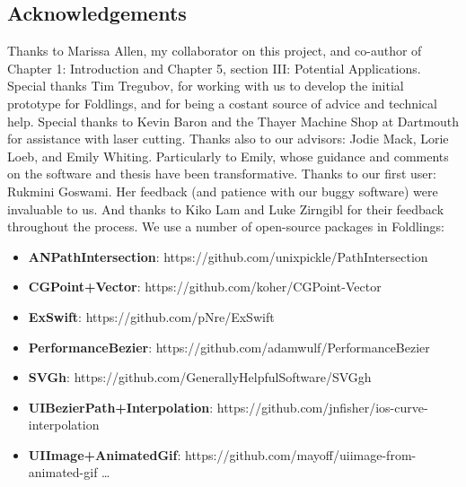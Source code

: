 \pagestyle{plain}
\begin{center}


\section*{Acknowledgements}
\singlespacing
Thanks to Marissa Allen, my collaborator on this project, and co-author of Chapter 1: Introduction and Chapter 5, section III: Potential Applications. \newline \newline
Special thanks Tim Tregubov, for working with us to develop the initial prototype for Foldlings, and for being a costant source of advice and technical help. \newline \newline
Special thanks to Kevin Baron and the Thayer Machine Shop at Dartmouth for assistance with laser cutting. \newline \newline
Thanks also to our advisors: Jodie Mack, Lorie Loeb, and Emily Whiting.  Particularly to Emily, whose guidance and comments on the software and thesis have been transformative. \newline \newline
Thanks to our first user: Rukmini Goswami.  Her feedback (and patience with our buggy software) were invaluable to us. \newline \newline
And thanks to Kiko Lam and Luke Zirngibl for their feedback throughout the process. \newline \newline \newline
We use a number of open-source packages in Foldlings:

\begin{itemize}
  \item \textbf{ANPathIntersection}: https://github.com/unixpickle/PathIntersection
  \item \textbf{CGPoint+Vector}: https://github.com/koher/CGPoint-Vector
  \item \textbf{ExSwift}: https://github.com/pNre/ExSwift
  \item \textbf{PerformanceBezier}: https://github.com/adamwulf/PerformanceBezier
  \item \textbf{SVGh}: https://github.com/GenerallyHelpfulSoftware/SVGgh
  \item \textbf{UIBezierPath+Interpolation}: https://github.com/jnfisher/ios-curve-interpolation
  \item \textbf{UIImage+AnimatedGif}: https://github.com/mayoff/uiimage-from-animated-gif \ldots
\end{itemize}


\end{center}

\doublespacing
\cleardoublepage
